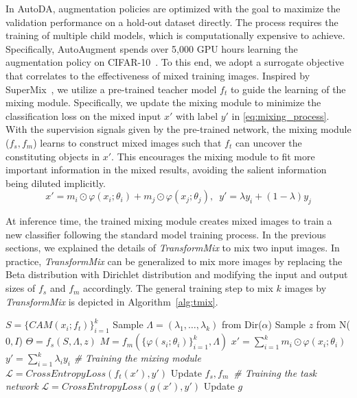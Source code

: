 \documentclass[10pt]{article} %
\newcommand{\TMIX}[0]{\textit{TransformMix }}
\begin{document}
In AutoDA, augmentation policies are optimized with the goal to maximize the validation performance on a hold-out dataset directly. The process requires the training of multiple child models, which is computationally expensive to achieve. Specifically, AutoAugment spends over 5,000 GPU hours learning the augmentation policy on CIFAR-10~\citep{aa}. To this end, we adopt a surrogate objective that correlates to the effectiveness of mixed training images. Inspired by SuperMix~\citep{supermix}, we utilize a pre-trained teacher model $f_t$ to guide the learning of the mixing module. Specifically, we update the mixing module to minimize the classification loss on the mixed input $x'$ with label $y'$ in \eqref{eq:mixing_process}. With the supervision signals given by the pre-trained network, the mixing module ($f_s, f_m$) learns to construct mixed images such that $f_t$ can uncover the constituting objects in $x'$. This encourages the mixing module to fit more important information in the mixed results, avoiding the salient information being diluted implicitly. 
\begin{equation} \label{eq:mixing_process}
	x' = m_i \odot \varphi(x_i;\theta_i) + m_j \odot \varphi(x_j;\theta_j), \,\,\,
	y' = \lambda y_i + (1-\lambda)y_j
\end{equation}

At inference time, the trained mixing module creates mixed images to train a new classifier following the standard model training process. In the previous sections, we explained the details of \TMIX to mix two input images. In practice, \TMIX can be generalized to mix more images by replacing the Beta distribution with Dirichlet distribution and modifying the input and output sizes of $f_s$ and $f_m$ accordingly. The general training step to mix $k$ images by \TMIX is depicted in Algorithm~\ref{alg:tmix}.

\label{app:algor}
\begin{algorithm}
\begin{algorithmic}[1]
\caption{Training of \TMIX}
\label{alg:tmix}
\State $S = \{\mathit{CAM}(x_i;f_t)\}_{i=1}^k$
\State Sample $\Lambda=(\lambda_1, \ldots, \lambda_{k})$ from Dir($\alpha$)
\State Sample $z$ from N($0, I$)
\State $\Theta = f_s(S, \Lambda, z)$
\State $M = f_m( \{ \varphi(s_i;\theta_i)\}_{i=1}^k, \Lambda)$
\State $x' = \sum_{i=1}^{k} m_i \odot \varphi(x_i;\theta_i)$
\State $y' = \sum_{i=1}^{k} \lambda_i y_i$
 \textit{\textcolor{black!60}{\# Training the mixing module}}
	\State $\mathcal{L} = \mathit{CrossEntropyLoss}(f_t(x'), y')$
	\State Update $f_s, f_m$
\Else \,\textit{\textcolor{black!60}{\# Training the task network}}
	\State $\mathcal{L} = \mathit{CrossEntropyLoss}(g(x'), y')$
	\State Update $g$
\EndIf
\EndProcedure
\end{algorithmic}
\end{algorithm}
\end{document}
